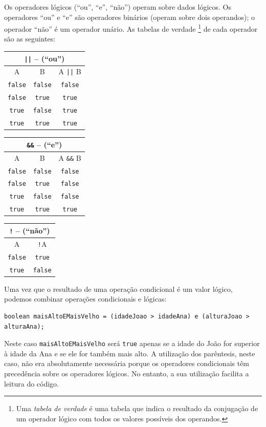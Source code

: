 Os operadores lógicos (``ou'', ``e'', ``não'') operam sobre dados lógicos. Os operadores ``ou'' e
``e'' são operadores binários (operam sobre dois operandos); o operador ``não'' é um operador unário. As tabelas 
de verdade%
\footnote{Uma \emph{tabela de verdade} é uma tabela que indica o resultado da conjugação de um operador lógico com todos os valores possíveis dos operandos.}
 de cada operador são as seguintes:
\begin{center}
\begin{tabular}{c|c|c}
\multicolumn{3}{c}{\texttt{||} -- (``ou'')}\\
\hline
A & B & A \texttt{||} B\\
\hline
\texttt{false} & \texttt{false} & \texttt{false}\\
\texttt{false} & \texttt{true} & \texttt{true}\\
\texttt{true} & \texttt{false} & \texttt{true}\\
\texttt{true} & \texttt{true} & \texttt{true}\\
\end{tabular}
\end{center}

\begin{center}
\begin{tabular}{c|c|c}
\multicolumn{3}{c}{\texttt{\&\&} -- (``e'')}\\
\hline
A & B & A \texttt{\&\&} B\\
\hline
\texttt{false} & \texttt{false} & \texttt{false}\\
\texttt{false} & \texttt{true} & \texttt{false}\\
\texttt{true} & \texttt{false} & \texttt{false}\\
\texttt{true} & \texttt{true} & \texttt{true}\\
\end{tabular}
\end{center}

\begin{center}
\begin{tabular}{c|c}
\multicolumn{2}{c}{\texttt{!} -- (``não'')}\\
\hline
A & \texttt{!}A\\
\hline
\texttt{false} & \texttt{true}\\
\texttt{true} & \texttt{false} \\
\end{tabular}
\end{center}

Uma vez que o resultado de uma operação condicional é um valor lógico, podemos combinar operações condicionais
e lógicas:
\begin{lstlisting}
boolean maisAltoEMaisVelho = (idadeJoao > idadeAna) e (alturaJoao > alturaAna);
\end{lstlisting}
Neste caso \texttt{maisAltoEMaisVelho} será \texttt{true} apenas se a idade do João
for superior à idade da Ana e se ele for também mais alto. A utilização dos parêntesis, neste
caso, não era absolutamente necessária porque os operadores condicionais têm precedência
sobre os operadores lógicos. No entanto, a sua utilização facilita a leitura do código.

